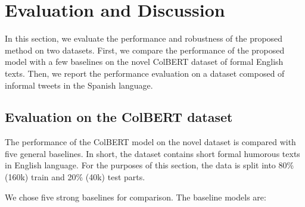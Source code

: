 \documentclass{article}
\begin{document}
\section{Evaluation and Discussion}

In this section, we evaluate the performance and robustness of the proposed method on two datasets. First, we compare the performance of the proposed model with a few baselines on the novel ColBERT dataset of formal English texts. Then, we report the performance evaluation on a dataset composed of informal tweets in the Spanish language.

\subsection{Evaluation on the ColBERT dataset}

The performance of the ColBERT model on the novel dataset is compared with five general baselines. In short, the dataset contains short formal humorous texts in English language. For the purposes of this section, the data is split into 80\% (160k) train and 20\% (40k) test parts.



We chose five strong baselines for comparison. The baseline models are:
\end{document}
